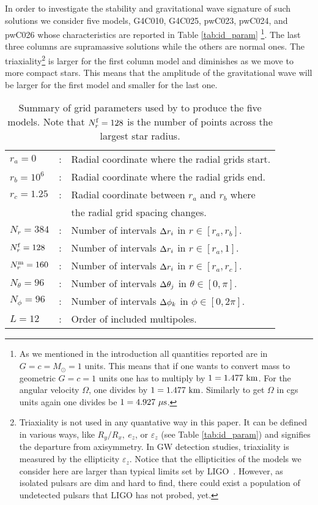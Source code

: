 \documentclass[twocolumn,superscriptaddress,showpacs,prd,aps,amsmath,amssymb,nofootinbib]{revtex4-1}
\begin{document}
In order to investigate the stability and gravitational wave signature
of such solutions we
consider five models, G4C010, G4C025, pwC023, pwC024, and pwC026 whose
characteristics are reported in Table \ref{tab:id_param}
\footnote{As we mentioned in the introduction all quantities reported
are in $G=c=M_\odot=1$ units. This means that if one wants to
convert mass to geometric $G=c=1$ units one has to multiply by
$1=1.477\ {\rm km}$. For the angular velocity $\Omega$, one divides
by $1=1.477\ {\rm km}$. Similarly to get $\Omega$ in cgs units again
one divides be $1=4.927\ {\rm \mu s}$.}.
The last three columns are
supramassive solutions while the others are normal ones. 
The triaxiality\footnote{Triaxiality is not used in any quantative way
in this paper. It can be defined in various ways, like $R_y/R_x,\ e_z$,
or $\varepsilon_z$ (see Table \ref{tab:id_param}) and signifies the departure 
from axisymmetry. In GW detection studies, triaxiality is measured by the 
ellipticity $\varepsilon_z$. Notice that the ellipticities of the models we consider here are 
larger than typical limits set by LIGO~\cite{Abbottetal17}. 
However, as isolated pulsars are dim and hard to find, there could exist
a population of undetected pulsars that LIGO has not probed, yet. } 
is larger for the first column model and diminishes as we move to more
compact stars. This means that the amplitude of the gravitational wave
will be larger for the first model and smaller for the last one.

\begin{table}
\begin{tabular}{lll}
\hline
\hline
$r_a=0$         &:& Radial coordinate where the radial grids start.       \\
$r_b=10^6$      &:& Radial coordinate where the radial grids end.     \\
$r_c=1.25$      &:& Radial coordinate between $r_a$ and $r_b$ where   \\
&\phantom{:}  & the radial grid spacing changes.   \\
$N_{r}=384$     &:& Number of intervals $\Delta r_i$ in $r \in[r_a,r_{b}]$. \\
${N_r^{\rm f}}=128$      &:& Number of intervals $\Delta r_i$ in $r \in[r_a,1]$. \\
${N_r^{\rm m}}=160$      &:& Number of intervals $\Delta r_i$ in $r \in[r_a,r_{c}]$. \\
$N_{\theta}=96$ &:& Number of intervals $\Delta \theta_j$ in $\theta\in[0,\pi]$. \\
$N_{\phi}=96$   &:& Number of intervals $\Delta \phi_k$ in $\phi\in[0,2\pi]$. \\
$L=12$          &:& Order of included multipoles. \\
\hline
\hline
\end{tabular}  
\caption{Summary of grid parameters used by \cocal{} to produce the five models.
Note that ${N_r^{\rm f}}=128$ is the number of points across the largest star radius. }
\label{tab:grids_param}
\end{table}
\end{document}
